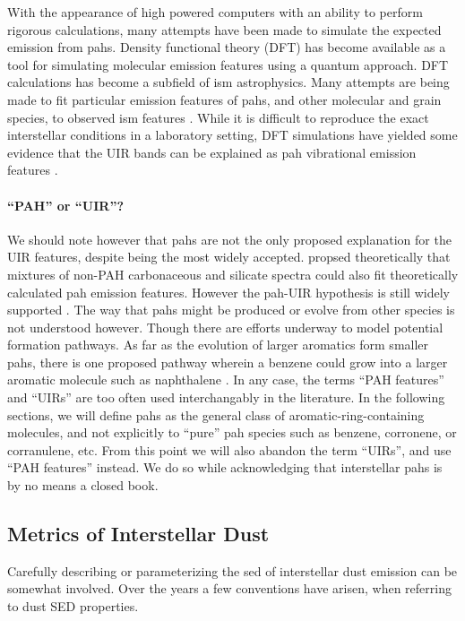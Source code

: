      With the appearance of high powered computers with an ability to perform rigorous calculations, many attempts have been made to simulate the expected emission from \acrshort{pah}s. Density functional theory (DFT) \citep{honenberg64} has become available as a tool for simulating molecular emission features using a quantum approach. DFT calculations has become a subfield of \acrshort{ism} astrophysics. Many attempts are being made to fit particular emission features of \acrshort{pah}s, and other molecular and grain species, to observed \acrshort{ism} features \citep{hammonds09,hirata99}.
     While it is difficult to reproduce the exact interstellar conditions in a laboratory setting, DFT simulations have yielded some evidence that the UIR bands can be explained as \acrshort{pah} vibrational emission features \citep{pathak12,ricca11,yu12}.

    \paragraph{``PAH'' or ``UIR''?}
      We should note however that \acrshort{pah}s are not the only proposed explanation for the UIR features, despite being the most widely accepted. \cite{zhang14} propsed theoretically that mixtures of non-PAH carbonaceous and silicate spectra could also fit theoretically calculated \acrshort{pah} emission features. However the \acrshort{pah}-UIR hypothesis is still widely supported \citep{tielens08,rastogi13}.  The way that \acrshort{pah}s might be produced or evolve from other species is not understood however. Though there are efforts underway to model potential formation pathways. As far as the evolution of larger aromatics form smaller \acrshort{pah}s, there is one proposed pathway wherein a benzene could grow into a larger aromatic molecule such as naphthalene \citep{ghesquiere14}. In any case, the terms ``PAH features'' and ``UIRs'' are too often used interchangably in the literature. In the following sections, we will define \acrshort{pah}s as the general class of aromatic-ring-containing molecules, and not explicitly to ``pure'' \acrshort{pah} species such as benzene, corronene, or corranulene, etc. From this point we will also abandon the term ``UIRs'', and use ``PAH features'' instead. We do so while acknowledging that interstellar \acrshort{pah}s is by no means a closed book.



     \subsection{Metrics of Interstellar Dust}
      Carefully describing or parameterizing the \acrshort{sed} of interstellar dust emission can be somewhat involved. Over the years a few conventions have arisen, when referring to dust SED properties.

